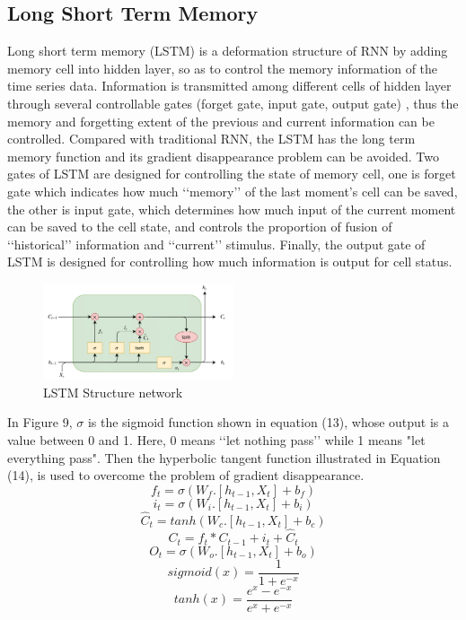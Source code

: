 \documentclass{ieeeojies}
\begin{document}
\subsection{Long Short Term Memory}
Long short term memory (LSTM) \cite{b12} is a deformation structure of RNN by adding memory cell into hidden layer, so as to control the memory information of the time series data. Information is transmitted among different cells of hidden layer through several controllable gates (forget gate, input gate, output gate) \cite{b13}, thus the memory and forgetting extent of the previous and current information can be controlled. Compared with traditional RNN, the LSTM has the long term memory function and its gradient disappearance problem can be avoided. Two gates of LSTM are designed for controlling the state of memory cell, one is forget gate which indicates how much ‘‘memory’’ of the last moment’s cell can be saved, the other is input gate, which determines how much input of the current moment can be saved to the cell state, and controls the proportion of fusion of ‘‘historical’’ information and ‘‘current’’ stimulus. Finally, the output gate of LSTM is designed for controlling how much information is output for cell status.
\begin{figure} [H]
    \centering
    \includegraphics[width=0.5\textwidth]{bibliography/Figure/LSTM _structure.png}
    \caption{LSTM Structure network}
    \label{fig:LSTM structure}
\end{figure}

In Figure 9, $\sigma$ is the sigmoid function shown in equation (13), whose output is a value between 0 and 1. Here, 0 means ‘‘let nothing pass’’ while 1 means "let everything pass". Then the hyperbolic tangent function illustrated in Equation (14), is used to overcome the problem of gradient disappearance.
\begin{equation}
    f_t = \sigma(W_f.[h_{t-1}, X_t] + b_f)
\end{equation}
\begin{equation}
    i_t = \sigma(W_i.[h_{t-1}, X_t] + b_i)
\end{equation}
\begin{equation}
   \hat{C}_t = tanh(W_c.[h_{t-1}, X_t] + b_c)
\end{equation}
\begin{equation}
   C_t = f_t*C_{t-1} + i_t + \hat{C}_t
\end{equation}
\begin{equation}
   O_t = \sigma(W_o.[h_{t-1}, X_t] + b_o)
\end{equation}
\begin{equation}
    sigmoid(x) = \frac{1}{1+e^{-x}}
\end{equation}
\begin{equation}
    tanh(x) = \frac{e^x - e^{-x}}{e^x + e^{-x}}
\end{equation}
\end{document}
